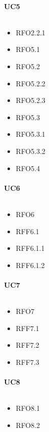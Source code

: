\paragraph{UC5}
$\medspace$
\begin{multicols}{3}
    \begin{itemize}
        \item RFO2.2.1
        \item RFO5.1
        \item RFO5.2
        \item RFO5.2.2
        \item RFO5.2.3
        \item RFO5.3
        \item RFO5.3.1
        \item RFO5.3.2
        \item RFO5.4
    \end{itemize}
\end{multicols}

\paragraph{UC6}
$\medspace$
\begin{multicols}{3}
    \begin{itemize}
        \item RFO6
        \item RFF6.1
        \item RFF6.1.1
        \item RFF6.1.2
    \end{itemize}
\end{multicols}

\paragraph{UC7}
$\medspace$
\begin{multicols}{3}
    \begin{itemize}
        \item RFO7
        \item RFF7.1
        \item RFF7.2
        \item RFF7.3
    \end{itemize}
\end{multicols}

\paragraph{UC8}
$\medspace$
\begin{multicols}{3}
    \begin{itemize}
        \item RFO8.1
        \item RFO8.2
    \end{itemize}
\end{multicols}

